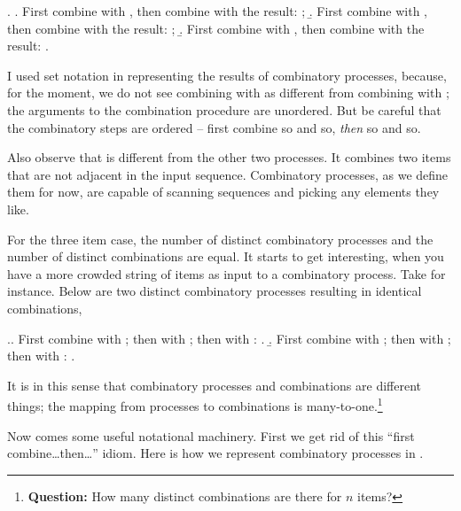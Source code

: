\documentclass[11pt,a4paper]{article}
\begin{document}
\ex. 
\a. First combine  with , then combine  with the result: ;
\b.\label{cprocJump} First combine  with , then combine  with the result: ;
\b. First combine  with , then combine  with the result: .


I used set notation in representing the results of combinatory processes, because, for the moment, we do not see combining  with  as different from combining  with ; the arguments to the combination procedure are unordered. But be careful that the combinatory steps are ordered -- first combine so and so, \emph{then} so and so.

Also observe that  is different from the other two processes. It combines two items that are not adjacent in the input sequence. Combinatory processes, as we define them for now, are capable of scanning sequences and picking any elements they like.  


For the three item case, the number of distinct combinatory processes and the number of distinct combinations are equal.  It starts to get interesting, when you have a more crowded string of items as input to a combinatory process. Take  for instance. Below are two distinct combinatory processes resulting in identical combinations, 

\ex.\label{mapping}\a.  First combine  with ; then  with ; then  with : .  
\b. First combine  with ; then  with ; then  with : .  


It is in this sense that combinatory processes and combinations are different things; the mapping from processes to combinations is many-to-one.\footnote{{\bf Question:} How many distinct combinations are there for $n$ items?} 

Now comes some useful notational machinery. First we get rid of this ``first combine\ldots then\ldots'' idiom. Here is how we represent combinatory processes in . 
\end{document}
